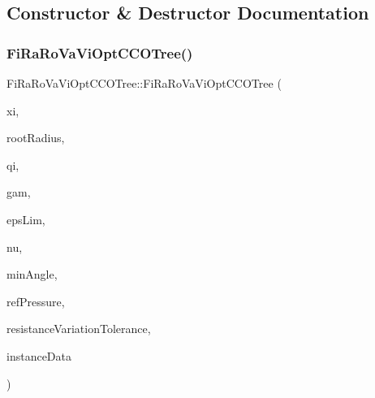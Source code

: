 \subsection{Constructor \& Destructor Documentation}
\mbox{\label{class_fi_ra_ro_va_vi_opt_c_c_o_tree_ac2d5f0113e6130aad2c70d650ea3cc50}} 
\subsubsection{\texorpdfstring{Fi\+Ra\+Ro\+Va\+Vi\+Opt\+C\+C\+O\+Tree()}{FiRaRoVaViOptCCOTree()}\hspace{0.1cm}{\footnotesize\ttfamily [1/2]}}
{\footnotesize\ttfamily Fi\+Ra\+Ro\+Va\+Vi\+Opt\+C\+C\+O\+Tree\+::\+Fi\+Ra\+Ro\+Va\+Vi\+Opt\+C\+C\+O\+Tree (\begin{DoxyParamCaption}\item[{\mbox{\hyperlink{structpoint}{point}}}]{xi,  }\item[{double}]{root\+Radius,  }\item[{double}]{qi,  }\item[{\mbox{\hyperlink{class_abstract_constraint_function}{Abstract\+Constraint\+Function}}$<$ double, int $>$ $\ast$}]{gam,  }\item[{\mbox{\hyperlink{class_abstract_constraint_function}{Abstract\+Constraint\+Function}}$<$ double, int $>$ $\ast$}]{eps\+Lim,  }\item[{\mbox{\hyperlink{class_abstract_constraint_function}{Abstract\+Constraint\+Function}}$<$ double, int $>$ $\ast$}]{nu,  }\item[{double}]{min\+Angle,  }\item[{double}]{ref\+Pressure,  }\item[{double}]{resistance\+Variation\+Tolerance,  }\item[{\mbox{\hyperlink{class_generator_data}{Generator\+Data}} $\ast$}]{instance\+Data }\end{DoxyParamCaption})}

